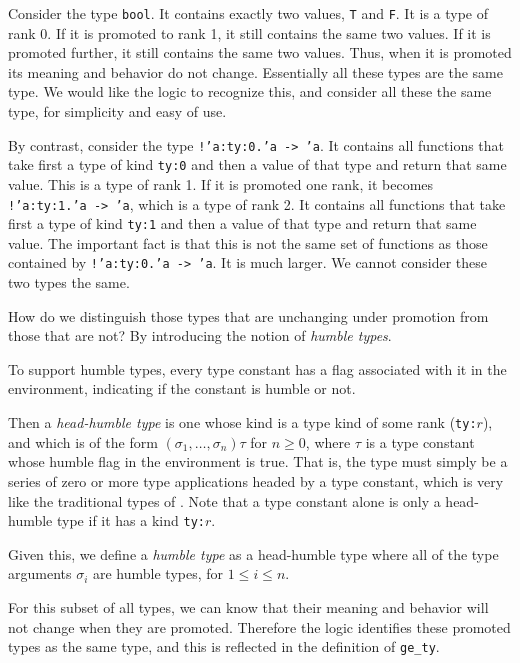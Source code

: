 Consider the type {\tt bool}. It contains exactly two values, 
{\tt T} and {\tt F}. It is a type of rank 0. If it is promoted to
rank 1, it still contains the same two values. If it is promoted
further, it still contains the same two values. Thus,  when it 
is promoted its meaning and behavior do not change. Essentially all
these types are the same type. We would like the \HOLW{} logic
to recognize this, and consider all these the same type, for simplicity
and easy of use.

By contrast, consider the type {\tt !'a:ty:0.'a~->~'a}. It contains all
functions that take first a type of kind {\tt ty:0}
and then a value of that type and return that same value.
This is a type of rank 1. If it is promoted one rank, it becomes
{\tt !'a:ty:1.'a~->~'a}, which is a type of rank 2.
It contains all functions that take first a type of kind {\tt ty:1}
and then a value of that type and return that same value.
The important fact is that this is not the same set of functions as
those contained by {\tt !'a:ty:0.'a~->~'a}. It is much larger.
We cannot consider these two types the same.

How do we distinguish those types that are unchanging
under promotion from those that are not? By introducing the 
notion of {\it humble types}.

To support humble types, every type constant has a flag associated
with it in the environment, indicating if the constant is humble or not.

Then a {\it head-humble type\/} is one whose kind is a type kind of
some rank ({\tt ty:}$r$),
and which is of the form
$(\sigma_1,\ldots,\sigma_n)\tau$ for $n \ge 0$, where $\tau$ is a type
constant whose humble flag in the environment is true.
That is, the type must simply be a series of zero or more 
type applications headed by a type constant, which is very 
like the traditional types of \HOL. Note that a type constant
alone is only a head-humble type if it has a kind {\tt ty:}$r$.

Given this, we define a {\it humble type\/} as a head-humble type
where all of the type arguments $\sigma_i$ are humble types,
for $1 \le i \le n$.

For this subset of all \HOLW{} types, we can know that their
meaning and behavior will not change when they are promoted.
Therefore the \HOLW{} logic identifies these promoted types 
as the same type, and this is reflected in the definition 
of {\tt ge\_ty}.

